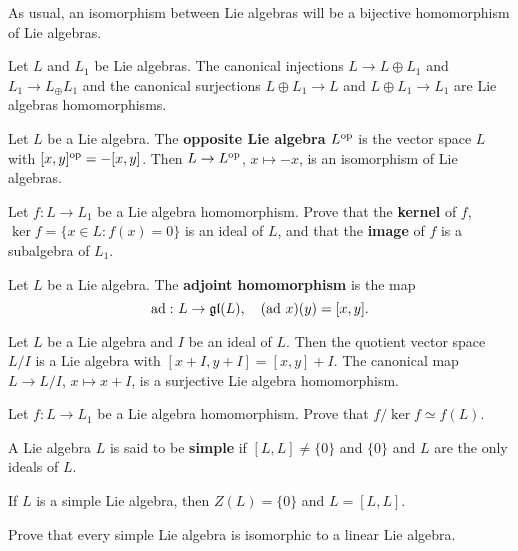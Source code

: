 As usual, an isomorphism between Lie algebras will be
a bijective homomorphism of Lie algebras. 

\begin{example}
    Let $L$ and $L_1$ be Lie algebras. The canonical injections
    $L\to L\oplus L_1$ and $L_1\to L_\oplus L_1$ and
    the canonical surjections $L\oplus L_1\to L$ and 
    $L\oplus L_1\to L_1$ are Lie algebras homomorphisms.  
\end{example}

\begin{example}
    Let $L$ be a Lie algebra. The \textbf{opposite Lie algebra} 
    $L^{\operatorname{op}}$ is the vector space $L$ with 
    $[x,y]^{\operatorname{op}}=-[x,y]$. Then $L\to L^{\operatorname{op}}$, $x\mapsto -x$, 
    is an isomorphism of Lie algebras.
\end{example}

\begin{exercise}
    Let $f\colon L\to L_1$ be a Lie algebra homomorphism. Prove
    that the \textbf{kernel} of $f$, 
    $\ker f=\{x\in L:f(x)=0\}$ is an ideal
    of $L$, and that the \textbf{image} of $f$ 
    is a subalgebra of $L_1$. 
\end{exercise}

\begin{example}
    Let $L$ be a Lie algebra. 
    The \textbf{adjoint homomorphism} is the map 
    \[
    \operatorname{ad}\,\colon L\to\mathfrak{gl}(L),\quad
    (\operatorname{ad}\,x)(y)=[x,y].
    \]
\end{example}

Let $L$ be a Lie algebra and $I$ be an ideal of $L$. Then 
the quotient vector space $L/I$ is a Lie algebra
with $[x+I,y+I]=[x,y]+I$. The canonical map 
$L\to L/I$, $x\mapsto x+I$, 
is a surjective Lie algebra homomorphism. 

\begin{exercise}
    Let $f\colon L\to L_1$ be a Lie algebra homomorphism.
    Prove that $f/\ker f\simeq f(L)$. 
\end{exercise}

\begin{definition}
    A Lie algebra $L$ is said to be \textbf{simple} if 
    $[L,L]\ne\{0\}$ and $\{0\}$ and $L$ are the only ideals of $L$. 
\end{definition}

If $L$ is a simple Lie algebra, then $Z(L)=\{0\}$ and $L=[L,L]$. 

\begin{exercise}
    Prove that every simple Lie algebra is isomorphic to 
    a linear Lie algebra. 
\end{exercise}

